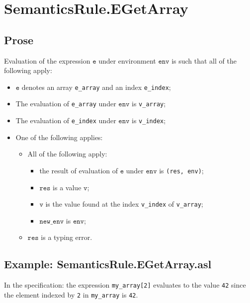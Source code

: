 \documentclass{book}
\newcommand\newenv[0]{\texttt{new\_env}}
\newcommand\env[0]{\texttt{env}}
\newcommand\ve[0]{\texttt{e}}
\newcommand\vv[0]{\texttt{v}}
\newcommand\vres[0]{\texttt{res}}
\begin{document}

\section{SemanticsRule.EGetArray \label{sec:SemanticsRule.EGetArray}}

  \subsection{Prose}
  Evaluation of the expression $\ve$ under environment $\env$ is
  such that all of the following apply:
  \begin{itemize}
  \item $\ve$ denotes an array \texttt{e\_array} and an index \texttt{e\_index};
  \item The evaluation of \texttt{e\_array} under $\env$ is \texttt{v\_array};
  \item The evaluation of \texttt{e\_index} under $\env$ is \texttt{v\_index};
  \item One of the following applies:
        \begin{itemize}
        \item All of the following apply:
          \begin{itemize}
          \item the result of evaluation of $\ve$ under $\env$ is \texttt{(res, env)};
          \item $\vres$ is a value $\vv$;
          \item $\vv$ is the value found at the index \texttt{v\_index} of \texttt{v\_array};
          \item $\newenv$ is $\env$;
          \end{itemize}

        \item $\vres$ is a typing error.
        \end{itemize}
  \end{itemize}

  \subsection{Example: SemanticsRule.EGetArray.asl}
    In the specification:
    the expression \texttt{my\_array[2]} evaluates to the value \texttt{42} since the element
    indexed by \texttt{2} in \texttt{my\_array} is \texttt{42}.
\end{document}
